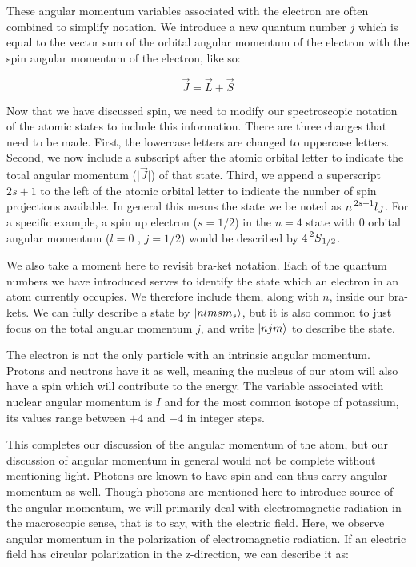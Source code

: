 \documentclass[12pt]{article}
\begin{document}
        These angular momentum variables associated with the
        electron are often combined to simplify notation. We
        introduce a new quantum number $j$ which is equal to
        the vector sum of the orbital angular momentum of the
        electron with the spin angular momentum of the electron,
        like so: 

        \begin{equation}
            \vec{J} = \vec{L} + \vec{S}
        \end{equation}

        Now that we have discussed spin, we need to modify our 
        spectroscopic notation of the atomic states to include
        this information. There are three changes that need to 
		be made. First, the lowercase letters are changed to
		uppercase letters. Second, we now include a subscript after
        the atomic orbital letter to indicate the total angular
        momentum ($\vert\vec{J}\vert$) of that state. 
		Third, we append a superscript $2s+1$ to the left of
		the atomic orbital letter to indicate the number of
		spin projections available. In general
		this means the state we be noted as $n\prescript{2s+1}{}l_{J}$. For 
		a specific example, 
        a spin up electron ($s=1/2$) in the $n=4$ state with 
        0 orbital angular momentum ($l=0$ , $j=1/2$) would be 
        described by $4\prescript{2}{}S_{1/2}$.

		We also take a moment here to revisit bra-ket notation.
		Each of the quantum numbers we have introduced serves
		to identify the state which an electron in an atom 
		currently occupies. We therefore include them, along with
		$n$, inside our bra-kets. We can fully describe a state by
		$\ket{nlmsm_s}$, but it is also common to just focus on
		the total angular momentum $j$, and write $\ket{njm}$ to
		describe the state.

        The electron is not the only particle with an intrinsic
        angular momentum. Protons and neutrons have it as well,
        meaning the nucleus of our atom will also have a
        spin which will contribute to the energy. The variable
        associated with nuclear angular momentum is $I$ and
        for the most common isotope of potassium, its values
        range between $+4$ and $-4$ in integer steps. 
	
		This completes our discussion of the angular momentum
		of the atom, but our discussion of angular momentum in 
		general would not be complete without mentioning light.
		Photons are known to have spin and can thus carry 
		angular momentum as well. Though photons are mentioned
		here to introduce source of the angular momentum,
		we will primarily deal with
		electromagnetic radiation in the macroscopic sense, 
		that is to say, with the electric field. Here, we 
		observe angular momentum in the polarization of 
		electromagnetic radiation. If an electric field has
		circular polarization in the z-direction, we can 
		describe it as:
\end{document}
